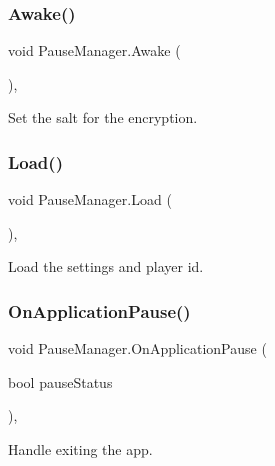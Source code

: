 \subsubsection{\texorpdfstring{Awake()}{Awake()}}
{\footnotesize\ttfamily void Pause\+Manager.\+Awake (\begin{DoxyParamCaption}{ }\end{DoxyParamCaption})\hspace{0.3cm}{\ttfamily [inline]}, {\ttfamily [private]}}



Set the salt for the encryption. 

\mbox{\label{class_pause_manager_a8666e6da14b6f6b2287e34c5775e21c7}} 
\subsubsection{\texorpdfstring{Load()}{Load()}}
{\footnotesize\ttfamily void Pause\+Manager.\+Load (\begin{DoxyParamCaption}{ }\end{DoxyParamCaption})\hspace{0.3cm}{\ttfamily [inline]}, {\ttfamily [private]}}



Load the settings and player id. 

\mbox{\label{class_pause_manager_adccb03eddbe4377a0153565456c92325}} 
\subsubsection{\texorpdfstring{OnApplicationPause()}{OnApplicationPause()}}
{\footnotesize\ttfamily void Pause\+Manager.\+On\+Application\+Pause (\begin{DoxyParamCaption}\item[{bool}]{pause\+Status }\end{DoxyParamCaption})\hspace{0.3cm}{\ttfamily [inline]}, {\ttfamily [private]}}



Handle exiting the app. 

\mbox{\label{class_pause_manager_a0150346b902b664ce65d5e1b840d9d4d}} 
